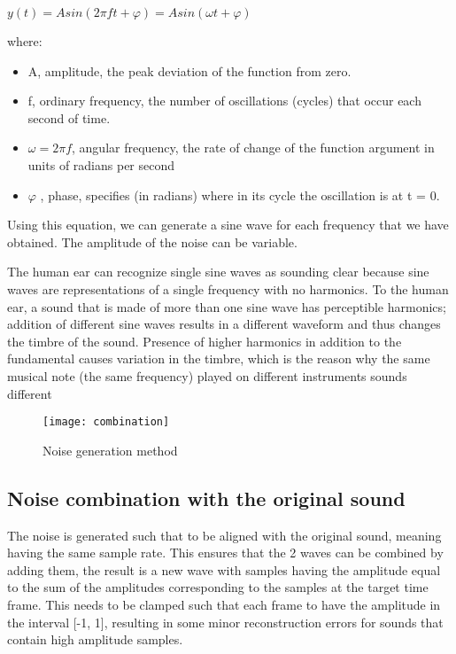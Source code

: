 \documentclass[12pt]{report}
\begin{document}
\begin{center}
\begin{math}
y(t) = A sin(2\pi f t + \varphi ) = A sin(\omega t + \varphi )
\end{math}
\end{center}

where:
\begin{itemize}

\item A, amplitude, the peak deviation of the function from zero.
\item f, ordinary frequency, the number of oscillations (cycles) that occur each second of time.
\item 
\begin{math} \omega = 2 \pi f \end{math}, angular frequency, the rate of change of the function argument in units of radians per second 
\item
\begin{math} \varphi \end{math}
, phase, specifies (in radians) where in its cycle the oscillation is at t = 0.
\end{itemize}

Using this equation, we can generate a sine wave for each frequency that we have obtained. The amplitude of the noise can be variable.

The human ear can recognize single sine waves as sounding clear because sine waves are representations of a single frequency with no harmonics. 
To the human ear, a sound that is made of more than one sine wave has perceptible harmonics; addition of different sine waves results in a different waveform and thus changes the timbre of the sound. Presence of higher harmonics in addition to the fundamental causes variation in the timbre, which is the reason why the same musical note (the same frequency) played on different instruments sounds different

\begin{figure}[h]
\centering
\texttt{[image: combination]}
\caption{Noise generation method}
\label{fig:noise_generation}
\end{figure}


\subsection{Noise combination with the original sound}
The noise is generated such that to be aligned with the original sound, meaning having the same sample rate. This ensures that the 2 waves can be combined by adding them, the result is a new wave with samples having the amplitude equal to the sum of the amplitudes corresponding to the samples at the target time frame. This needs to be clamped such that each frame to have the amplitude in the interval [-1, 1], resulting in some minor reconstruction errors for sounds that contain high amplitude samples. 
\end{document}
